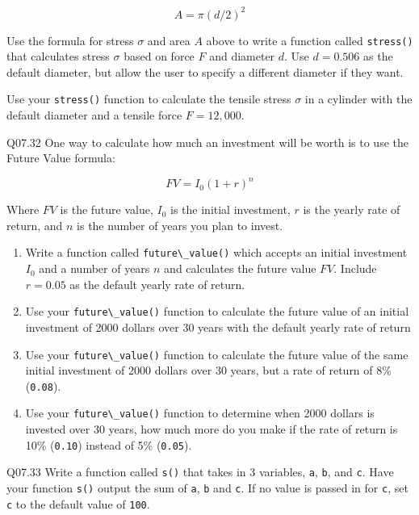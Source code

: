 \documentclass{book}
\newcommand{\passthrough}[1]{#1}
\begin{document}
\[ A = \pi(d/2)^2 \]

Use the formula for stress \(\sigma\) and area \(A\) above to write a
function called \passthrough{\lstinline!stress()!} that calculates
stress \(\sigma\) based on force \(F\) and diameter \(d\). Use
\(d=0.506\) as the default diameter, but allow the user to specify a
different diameter if they want.

Use your \passthrough{\lstinline!stress()!} function to calculate the
tensile stress \(\sigma\) in a cylinder with the default diameter and a
tensile force \(F = 12,000\).

Q07.32 One way to calculate how much an investment will be worth is to
use the Future Value formula:

\[ FV = I_0(1 + r)^n \]

Where \(FV\) is the future value, \(I_0\) is the initial investment,
\(r\) is the yearly rate of return, and \(n\) is the number of years you
plan to invest.

\begin{enumerate}
\def\labelenumi{(\alph{enumi})}
\item
  Write a function called \passthrough{\lstinline!future\_value()!}
  which accepts an initial investment \(I_0\) and a number of years
  \(n\) and calculates the future value \(FV\). Include \(r=0.05\) as
  the default yearly rate of return.
\item
  Use your \passthrough{\lstinline!future\_value()!} function to
  calculate the future value of an initial investment of 2000 dollars
  over 30 years with the default yearly rate of return
\item
  Use your \passthrough{\lstinline!future\_value()!} function to
  calculate the future value of the same initial investment of 2000
  dollars over 30 years, but a rate of return of 8\%
  (\passthrough{\lstinline!0.08!}).
\item
  Use your \passthrough{\lstinline!future\_value()!} function to
  determine when 2000 dollars is invested over 30 years, how much more
  do you make if the rate of return is 10\%
  (\passthrough{\lstinline!0.10!}) instead of 5\%
  (\passthrough{\lstinline!0.05!}).
\end{enumerate}

Q07.33 Write a function called \passthrough{\lstinline!s()!} that takes
in 3 variables, \passthrough{\lstinline!a!},
\passthrough{\lstinline!b!}, and \passthrough{\lstinline!c!}. Have your
function \passthrough{\lstinline!s()!} output the sum of
\passthrough{\lstinline!a!}, \passthrough{\lstinline!b!} and
\passthrough{\lstinline!c!}. If no value is passed in for
\passthrough{\lstinline!c!}, set \passthrough{\lstinline!c!} to the
default value of \passthrough{\lstinline!100!}.
    
\end{document}
